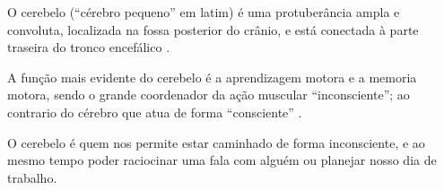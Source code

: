 \begin{elaboracion}[title=O cerebelo e o comportamento inconsciente, width= 1.00\linewidth]
O cerebelo (``cérebro pequeno'' em latim) é uma protuberância ampla e convoluta,
localizada na fossa posterior do crânio, 
e está conectada à parte traseira do tronco encefálico \cite[pp. 93]{gazzanigaciencia} \cite[pp. 87]{carneiro2004atlas}
\cite[pp. 516]{bearneurociencias}.

A função mais evidente do cerebelo é a aprendizagem motora e a memoria motora,
sendo o grande coordenador da ação muscular ``inconsciente'';
ao contrario do cérebro que atua de forma ``consciente'' 
\cite[pp. 93]{gazzanigaciencia} \cite[pp. 87]{carneiro2004atlas} \cite[pp. 516]{bearneurociencias}.

O cerebelo é quem nos permite estar caminhado de forma inconsciente,
e ao mesmo tempo poder raciocinar uma fala com alguém ou planejar nosso dia de trabalho.
\end{elaboracion}
